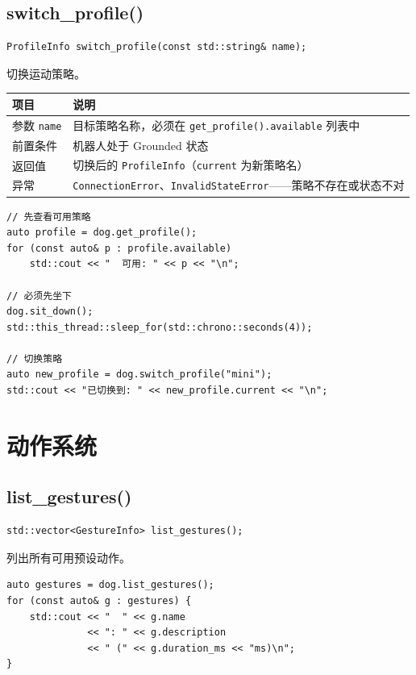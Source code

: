 \documentclass[a4paper,11pt,openany]{book}
\begin{document}
\subsection{switch\_profile()}

\begin{lstlisting}[style=cpp,numbers=none]
ProfileInfo switch_profile(const std::string& name);
\end{lstlisting}

切换运动策略。

\begin{longtable}{ll}
\toprule
项目 & 说明 \\
\midrule
\endhead
参数 \texttt{name} & 目标策略名称，必须在 \texttt{get\_profile().available} 列表中 \\
前置条件 & 机器人处于 Grounded 状态 \\
返回值 & 切换后的 \texttt{ProfileInfo}（\texttt{current} 为新策略名）\\
异常 & \texttt{ConnectionError}、\texttt{InvalidStateError}——策略不存在或状态不对 \\
\bottomrule
\end{longtable}

\begin{lstlisting}[style=cpp]
// 先查看可用策略
auto profile = dog.get_profile();
for (const auto& p : profile.available)
    std::cout << "  可用: " << p << "\n";

// 必须先坐下
dog.sit_down();
std::this_thread::sleep_for(std::chrono::seconds(4));

// 切换策略
auto new_profile = dog.switch_profile("mini");
std::cout << "已切换到: " << new_profile.current << "\n";
\end{lstlisting}

\section{动作系统}

\subsection{list\_gestures()}

\begin{lstlisting}[style=cpp,numbers=none]
std::vector<GestureInfo> list_gestures();
\end{lstlisting}

列出所有可用预设动作。

\begin{lstlisting}[style=cpp]
auto gestures = dog.list_gestures();
for (const auto& g : gestures) {
    std::cout << "  " << g.name
              << ": " << g.description
              << " (" << g.duration_ms << "ms)\n";
}
\end{lstlisting}
\end{document}
